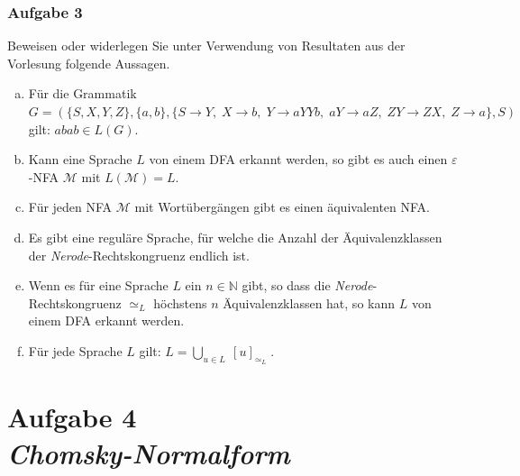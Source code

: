 \documentclass{beamer}
\begin{document}
	\begin{frame} \frametitle{Aufgabe 3}
		\small
		Beweisen oder widerlegen Sie unter Verwendung von Resultaten aus der Vorlesung folgende Aussagen.
		\begin{enumerate}[a)]
			\item F\"ur die Grammatik $G=(\{S,X,Y,Z\},\{a,b\},\{S\rightarrow Y,\;X\rightarrow b,\;Y\rightarrow aYYb,\;aY\rightarrow aZ,\;ZY\rightarrow ZX,\;Z\rightarrow a\},S)$ gilt: $abab\in L(G)$.
			\item Kann eine Sprache $L$ von einem DFA erkannt werden, so gibt es auch einen
			$\varepsilon$-NFA $\mathcal M$ mit $L({\mathcal M})=L$.
			\item F\"ur jeden NFA $\mathcal M$ mit Wort\"uberg\"angen gibt es einen \"aquivalenten NFA.
			\item Es gibt eine regul\"are Sprache, f\"ur welche die Anzahl der \"Aquivalenzklassen der  {\emph{Nerode}}-Rechtskongruenz endlich ist.
			\item Wenn es f\"ur eine Sprache $L$ ein $n\in \mathbb N$ gibt, so dass die {\emph{Nerode}}-Rechtskongruenz $\simeq_L$ höchstens $n$ Äquivalenzklassen hat, so
			kann $L$ von einem DFA erkannt werden.
			\item F\"ur jede Sprache $L$ gilt: $\displaystyle L = \bigcup\limits_{u \in L} \ [u]_{\simeq_{L}}\;$.
		\end{enumerate}
	\end{frame}


	\section{Aufgabe 4 \\ \itshape Chomsky-Normalform}
	
\end{document}

